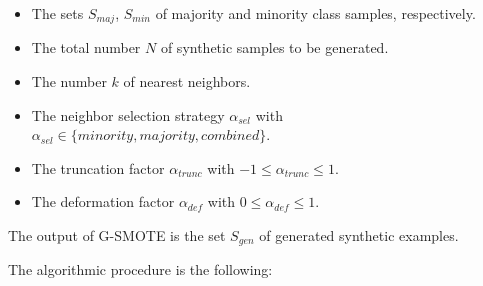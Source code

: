 \documentclass[parskip=full]{scrartcl}
\begin{document}
\begin{itemize}

\renewcommand\labelitemi{--}

\item The sets \( S_{maj} \),  \( S_{min} \) of majority and minority class samples, respectively.

\item The total number \( N \) of synthetic samples to be generated.

\item The number \( k \) of nearest neighbors.

\item The neighbor selection strategy \( \alpha_{sel} \) with \( \alpha_{sel} \in \Big\{ minority, majority, combined \Big\} \).

\item The truncation factor \( \alpha_{trunc} \) with \( -1 \leq \alpha_{trunc} \leq 1 \). 

\item The deformation factor \( \alpha_{def} \) with \( 0 \leq \alpha_{def} \leq 1 \).

\end{itemize}

The output of G-SMOTE is the set \( S_{gen} \) of generated synthetic examples.

The algorithmic procedure is the following:
\end{document}
